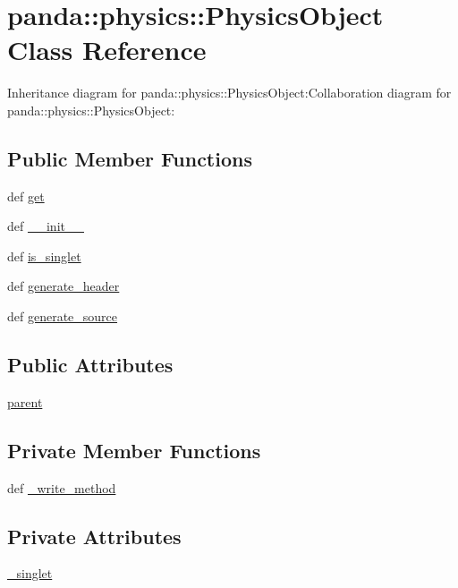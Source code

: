 \hypertarget{classpanda_1_1physics_1_1PhysicsObject}{
\section{panda::physics::PhysicsObject Class Reference}
\label{classpanda_1_1physics_1_1PhysicsObject}
}
Inheritance diagram for panda::physics::PhysicsObject:Collaboration diagram for panda::physics::PhysicsObject:\subsection*{Public Member Functions}
\begin{DoxyCompactItemize}
\item 
def \hyperlink{classpanda_1_1physics_1_1PhysicsObject_a22fc5429883c27ee042473216e0f38e6}{get}
\item 
def \hyperlink{classpanda_1_1physics_1_1PhysicsObject_ad1ec10ebcf5de122d3ce6299800706c0}{\_\-\_\-init\_\-\_\-}
\item 
def \hyperlink{classpanda_1_1physics_1_1PhysicsObject_a0640f5ce8e4af9b7d24f49889dbaee12}{is\_\-singlet}
\item 
def \hyperlink{classpanda_1_1physics_1_1PhysicsObject_a89cba40b340a08acb2f22fc52b89b847}{generate\_\-header}
\item 
def \hyperlink{classpanda_1_1physics_1_1PhysicsObject_a487d99a30ce7c2d2fca1416b29b2c94f}{generate\_\-source}
\end{DoxyCompactItemize}
\subsection*{Public Attributes}
\begin{DoxyCompactItemize}
\item 
\hyperlink{classpanda_1_1physics_1_1PhysicsObject_a6ca430a7b140aa02d9ff950546d4d784}{parent}
\end{DoxyCompactItemize}
\subsection*{Private Member Functions}
\begin{DoxyCompactItemize}
\item 
def \hyperlink{classpanda_1_1physics_1_1PhysicsObject_a8826db7b741f0900af2ca801e21b1e18}{\_\-write\_\-method}
\end{DoxyCompactItemize}
\subsection*{Private Attributes}
\begin{DoxyCompactItemize}
\item 
\hyperlink{classpanda_1_1physics_1_1PhysicsObject_ad7e1a7fa97e447250d16918d889815ed}{\_\-singlet}
\end{DoxyCompactItemize}
